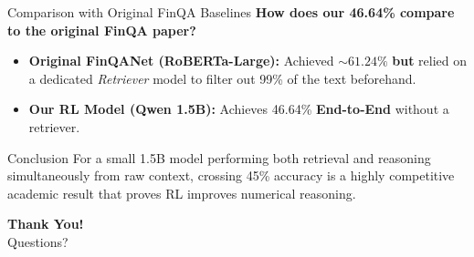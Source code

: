 \documentclass[aspectratio=169]{beamer}
\begin{document}
\begin{frame}{Comparison with Original FinQA Baselines}
    \textbf{How does our 46.64\% compare to the original FinQA paper?}
    \begin{itemize}
        \item \textbf{Original FinQANet (RoBERTa-Large):} Achieved $\sim 61.24\%$ \textbf{but} relied on a dedicated \textit{Retriever} model to filter out 99\% of the text beforehand.
        \item \textbf{Our RL Model (Qwen 1.5B):} Achieves 46.64\% \textbf{End-to-End} without a retriever.
    \end{itemize}
    \vspace{0.3cm}
    \begin{block}{Conclusion}
        For a small 1.5B model performing both retrieval and reasoning simultaneously from raw context, crossing 45\% accuracy is a highly competitive academic result that proves RL improves numerical reasoning.
    \end{block}
\end{frame}

\begin{frame}
    \begin{center}
        \Huge \textbf{Thank You!} \\
        \vspace{1cm}
        \normalsize Questions?
    \end{center}
\end{frame}
\end{document}
